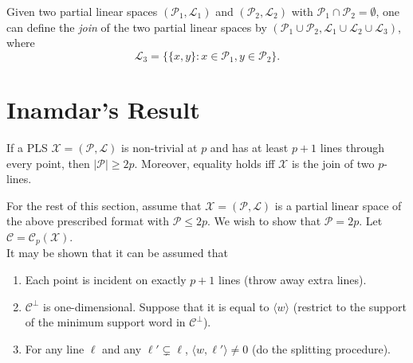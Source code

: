 \documentclass{article}
\begin{document}
	\begin{fdef}[Join]
		Given two partial linear spaces $(\mathcal{P}_1,\mathcal{L}_1)$ and $(\mathcal{P}_2,\mathcal{L}_2)$ with $\mathcal{P}_1 \cap \mathcal{P}_2 = \emptyset$, one can define the \emph{join} of the two partial linear spaces by $(\mathcal{P}_1 \cup \mathcal{P}_2, \mathcal{L}_1\cup\mathcal{L}_2\cup\mathcal{L}_3)$, where
		\[ \mathcal{L}_3 = \{ \{x,y\} : x \in \mathcal{P}_1, y \in \mathcal{P}_2 \}. \]
	\end{fdef}

\section{Inamdar's Result}


	\begin{ftheo}
		If a PLS $\mathcal{X} = (\mathcal{P},\mathcal{L})$ is non-trivial at $p$ and has at least $p+1$ lines through every point, then $|\mathcal{P}| \ge 2p$. Moreover, equality holds iff $\mathcal{X}$ is the join of two $p$-lines.
	\end{ftheo}

	For the rest of this section, assume that $\mathcal{X} = (\mathcal{P},\mathcal{L})$ is a partial linear space of the above prescribed format with $\mathcal{P} \le 2p$. We wish to show that $\mathcal{P} = 2p$. Let $\mathcal{C} = \mathcal{C}_p(\mathcal{X})$. \\
	It may be shown that it can be assumed that 
	\begin{enumerate}
		\item Each point is incident on exactly $p+1$ lines (throw away extra lines).
		\item $\mathcal{C}^\perp$ is one-dimensional. Suppose that it is equal to $\langle w \rangle$ (restrict to the support of the minimum support word in $\mathcal{C}^\perp$).
		\item For any line $\ell$ and any $\ell' \subsetneq \ell$, $\langle w,\ell'\rangle \ne 0$ (do the splitting procedure).
	\end{enumerate}
	
\end{document}
